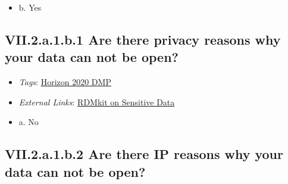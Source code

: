 \documentclass[a4paper,12pt]{report}
\begin{document}
\begin{itemize}
  \item[\CheckmarkBold] b. Yes
\end{itemize}




\subsection*{\protect\textcolor{colorSecId}{VII.2.a.1.b.1} Are there privacy reasons why your data can not be open?}

\label{6be88f7c-f868-460f-bba7-91e1c659adfd.a549d10b-aa46-4c0c-863f-30219ac5ecce.b3739ebd-2d8e-42d3-9425-a7d6d1b26c79.c010e830-bd89-460d-9498-cb41e7ffeb87.aac95530-2978-4759-803b-64721533faf0.019db0b3-9067-4134-8bfd-76db3cfc572a}


\begin{itemize}
  \item \textit{Tags}: \ul{Horizon 2020 DMP}
  
  \item \textit{External Links}: \href{https://rdmkit.elixir-europe.org/sensitive_data.html}{RDMkit on Sensitive Data}\end{itemize}




\begin{itemize}
  \item[\CheckmarkBold] a. No
\end{itemize}




\subsection*{\protect\textcolor{colorSecId}{VII.2.a.1.b.2} Are there IP reasons why your data can not be open?}

\label{6be88f7c-f868-460f-bba7-91e1c659adfd.a549d10b-aa46-4c0c-863f-30219ac5ecce.b3739ebd-2d8e-42d3-9425-a7d6d1b26c79.c010e830-bd89-460d-9498-cb41e7ffeb87.aac95530-2978-4759-803b-64721533faf0.a18d79d2-74b1-4524-a3c7-2c1a87b66a75}
\end{document}
